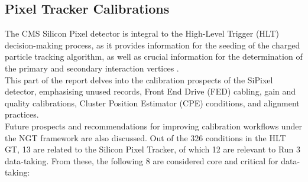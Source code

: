 \subsection{Pixel Tracker Calibrations}

The CMS Silicon Pixel detector is integral to the High-Level Trigger (HLT) decision-making process, as it provides information for the seeding of the charged particle tracking algorithm, as well as crucial information for the determination of the primary and secondary interaction vertices \cite{Dominguez:1481838,Adam_2021}.\\
This part of the report delves into the calibration prospects of the SiPixel detector, emphasising unused records, Front End Drive (FED) cabling, gain and quality calibrations, Cluster Position Estimator (CPE) conditions, and alignment practices.\\
Future prospects and recommendations for improving calibration workflows under the NGT framework are also discussed.\newline \newline 
Out of the 326 conditions in the HLT GT, 13 are related to the Silicon Pixel Tracker, of which 12 are relevant to Run 3 data-taking. From these, the following 8 are considered core and critical for data-taking:

